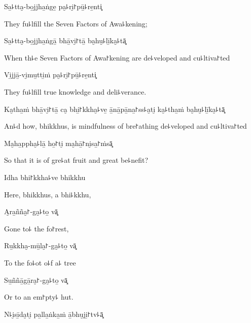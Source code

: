 Sa̱꜕tta̮-bo̱jjha̱ṅge̱ pa̮꜕ri̮꜓pū̱꜕re̱nti͓

\begin{english}
  They fu꜕lfill the Seven Factors of Awa꜕kening;
\end{english}

Sa̱꜕tta̮-bo̱jjha̱ṅgā̱ bhā̱vi̮꜓tā̱ ba̮hu̮꜕lī̱ka̮꜕tā͓

\begin{english}
  When th꜕e Seven Factors of Awa꜓kening are de꜕veloped and cu꜕ltiva꜓ted
\end{english}

Vi̱jjā̱-vi̮mu̱tti̱ṁ pa̮꜕ri̮꜓pū̱꜕re̱nti͓

\begin{english}
  They fu꜕lfill true knowledge and deli꜕verance.
\end{english}

\ifaivedition
\clearpage
\fi

Ka̮tha̱ṁ bhā̱vi̮꜓tā̱ ca̮ bhi̱꜓kkha̮꜕ve̱ ā̱nā̱pā̱na̱꜓ss꜕a̮ti̮ ka̮꜕tha̱ṁ ba̮hu̮꜕lī̱ka̮꜕tā͓

\begin{english}
  An꜕d how, bhikkhus, is mindfulness of bre꜓athing de꜕veloped and cu꜕ltiva꜓ted
\end{english}

Ma̮ha̱ppha̮꜕lā̱ ho̱꜓ti̮ ma̮hā̱꜓ni̮sa̱꜓ṁsā͓

\begin{english}
  So that it is of gre꜕at fruit and great be꜕nefit?
\end{english}

Idha bhi꜓kkha꜕ve bhikkhu

\begin{english}
  Here, bhikkhus, a bhi꜕kkhu,
\end{english}

A̮ra̱ñña̮꜓-ga̮꜕to̱ vā͓

\begin{english}
  Gone to꜕ the fo꜓rest,
\end{english}

Ru̱kkha̮-mū̱la̮꜓-ga̮꜕to̱ vā͓

\begin{english}
  To the fo꜕ot o꜕f a꜕ tree
\end{english}

Su̱ññā̱gā̱ra̮꜓-ga̮꜕to̱ vā͓

\begin{english}
  Or to an em꜓pty꜕ hut.
\end{english}

N꜕i̮sī̱da̮ti̮ pa̱lla̱ṅka̱ṁ ā̱bhu̮ji̱꜓tv꜕ā͓

